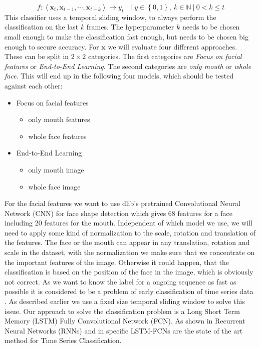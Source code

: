 \begin{equation}\label{eq:classifier}
f: \left\langle \mathbf{x}_{t}, \mathbf{x}_{t-1}, \cdots, \mathbf{x}_{t-k} \right\rangle \rightarrow y_{t} \quad |\ y \in \left\lbrace0,1\right\rbrace,\ k \in \mathbb{N}\ |\ 0<k\leq t
\end{equation}
This classifier uses a temporal sliding window, to always perform the classification on the last $k$ frames. The hyperparameter $k$ needs to be chosen  small enough to make the classification fast enough, but needs to be chosen big enough to secure accuracy.
For $\mathbf{x}$ we will evaluate four different approaches.
These can be split in $2 \times 2$ categories. The first categories are \emph{Focus on facial features} or \emph{End-to-End Learning}.
The second categories are \emph{only mouth} or \emph{whole face}.
This will end up in the following four models, which should be tested against each other:
\begin{itemize}
  \item Focus on facial features
  \begin{itemize}
  	\item only mouth features
  	\item whole face features
  \end{itemize}
  \item End-to-End Learning
  \begin{itemize}
  	\item only mouth image
  	\item whole face image
  \end{itemize}
\end{itemize}
For the facial features we want to use dlib's\cite{Dlib} pretrained Convolutional Neural Network (CNN) for face shape detection which gives 68 features for a face including 20 features for the mouth.
Independent of which model we use, we will need to apply some kind of normalization to the scale, rotation and translation of the features. The face or the mouth can appear in any translation, rotation and scale in the dataset, with the normalization we make sure that we concentrate on the important features of the image. Otherwise it could happen, that the classification is based on the position of the face in the image, which is obviously not correct.
As we want to know the label for a ongoing sequence as fast as possible it is considered to be a problem of early classification of time series
data \cite{Xing2011}. As described earlier we use a fixed size temporal sliding window to solve this issue.
Our approach to solve the classification problem is a Long Short Term Memory (LSTM) Fully Convolutional Network (FCN).
As shown in \cite{Fazle18} \cite{Fazle17} Recurrent Neural Networks (RNNs) and in specific LSTM-FCNs are the state of the art method for Time Series Classification.


